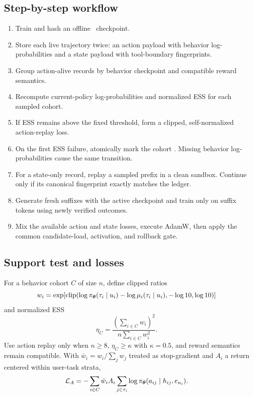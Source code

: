 \subsection{Step-by-step workflow}

\begin{enumerate}
  \item Train and hash an offline \prlhf\ checkpoint.
  \item Store each live trajectory twice: an action payload with behavior
  log-probabilities and a state payload with tool-boundary fingerprints.
  \item Group action-alive records by behavior checkpoint and compatible
  reward semantics.
  \item Recompute current-policy log-probabilities and normalized ESS for each
  sampled cohort.
  \item If ESS remains above the fixed threshold, form a clipped,
  self-normalized action-replay loss.
  \item On the first ESS failure, atomically mark the cohort
  .  Missing behavior log-probabilities cause the same
  transition.
  \item For a state-only record, replay a sampled prefix in a clean sandbox.
  Continue only if its canonical fingerprint exactly matches the ledger.
  \item Generate fresh suffixes with the active checkpoint and train only on
  suffix tokens using newly verified outcomes.
  \item Mix the available action and state losses, execute AdamW, then apply
  the common candidate-load, activation, and rollback gate.
\end{enumerate}

\subsection{Support test and losses}

For a behavior cohort $C$ of size $n$, define clipped ratios
\begin{equation}
  w_i
  =
  \exp\!\left[
    \operatorname{clip}\!\left(
      \log\pi_{\bm{\theta}}(\tau_i\mid u_i)-\log\mu_i(\tau_i\mid u_i),
      -\log 10,\log 10
    \right)
  \right]
\end{equation}
and normalized ESS
\begin{equation}
  \eta_C
  =
  \frac{\left(\sum_{i\in C}w_i\right)^2}
       {n\sum_{i\in C}w_i^2}.
  \label{eq:handoff-ess}
\end{equation}
Use action replay only when $n\ge 8$, $\eta_C\ge\kappa$ with
$\kappa=0.5$, and reward semantics remain compatible.  With
$\bar w_i=w_i/\sum_jw_j$ treated as stop-gradient and $A_i$ a return centered
within user-task strata,
\begin{equation}
  \mathcal{L}_A
  =
  -\sum_{i\in C}\bar w_i A_i
    \sum_{j\in\tau_i}
    \log\pi_{\bm{\theta}}(a_{ij}\mid h_{ij},e_{u_i}).
  \label{eq:action-replay}
\end{equation}

